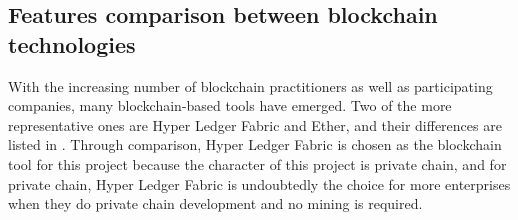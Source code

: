 \subsection{Features comparison between blockchain technologies}
With the increasing number of blockchain practitioners as well as participating companies, many blockchain-based tools have emerged. Two of the more representative ones are Hyper Ledger Fabric and Ether\cite{comparisionethhyper}, and their differences are listed in . Through comparison, Hyper Ledger Fabric is chosen as the blockchain tool for this project because the character of this project is private chain, and for private chain, Hyper Ledger Fabric is undoubtedly the choice for more enterprises when they do private chain development and no mining is required.

\begin{table}[H]
\centering
{}

\caption{Comparision between blockchain technologies}
\label{Table:comparisionblockchain}
\end{table}


